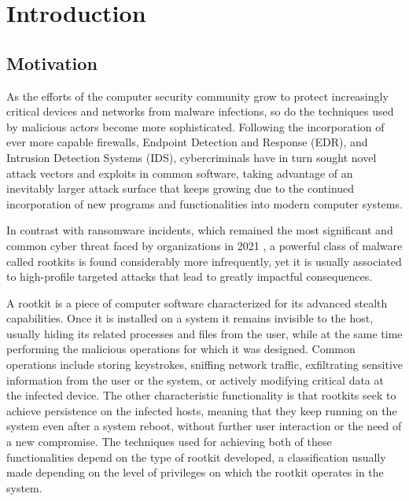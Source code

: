 \chapter{Introduction}
\section{Motivation} \label{section:motivation}

As the efforts of the computer security community grow to protect
increasingly critical devices and networks from malware infections, so do
the techniques used by malicious actors become more sophisticated.
Following the incorporation of ever more capable firewalls, Endpoint
Detection and Response (EDR), and Intrusion Detection Systems (IDS), cybercriminals have in turn sought novel attack vectors and exploits in common software, taking advantage of an inevitably larger attack surface that keeps growing due to the continued incorporation of new programs and functionalities into modern computer systems.

In contrast with ransomware incidents, which remained the most significant and common cyber threat faced by organizations in 2021 \cite{ransomware_pwc}, a powerful class of malware called rootkits is found considerably more infrequently, yet it is usually associated to high-profile targeted attacks that lead to greatly impactful consequences. 

A rootkit is a piece of computer software characterized for its advanced stealth capabilities. Once it is installed on a system it remains invisible to the host, usually hiding its related processes and files from the user, while at the same time performing the malicious operations for which it was designed. Common operations include storing keystrokes, sniffing network traffic, exfiltrating sensitive information from the user or the system, or actively modifying critical data at the infected device. The other characteristic functionality is that rootkits seek to achieve persistence on the infected hosts, meaning that they keep running on the system even after a system reboot, without further user interaction or the need of a new compromise.
The techniques used for achieving both of these functionalities depend on the type of rootkit developed, a classification usually made depending on the level of privileges on which the rootkit operates in the system.

